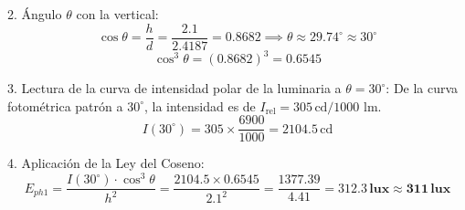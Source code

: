 \documentclass[]{informeutn}
\begin{document}
2. Ángulo $\theta$ con la vertical:
\begin{equation}
\cos\theta = \frac{h}{d} = \frac{2.1}{2.4187} = 0.8682 \implies \theta \approx 29.74^\circ \approx 30^\circ
\end{equation}
\begin{equation}
\cos^3\theta = (0.8682)^3 = 0.6545
\end{equation}

3. Lectura de la curva de intensidad polar de la luminaria a $\theta = 30^\circ$:
De la curva fotométrica patrón a $30^\circ$, la intensidad es de $I_{\text{rel}} = 305\,\text{cd/1000 lm}$.
\begin{equation}
I(30^\circ) = 305 \times \frac{6900}{1000} = 2104.5\,\text{cd}
\end{equation}

4. Aplicación de la Ley del Coseno:
\begin{equation}
E_{ph1} = \frac{I(30^\circ) \cdot \cos^3\theta}{h^2} = \frac{2104.5 \times 0.6545}{2.1^2} = \frac{1377.39}{4.41} = \mathbf{312.3\,\text{lux}} \approx \mathbf{311\,\text{lux}}
\end{equation}
\end{document}
